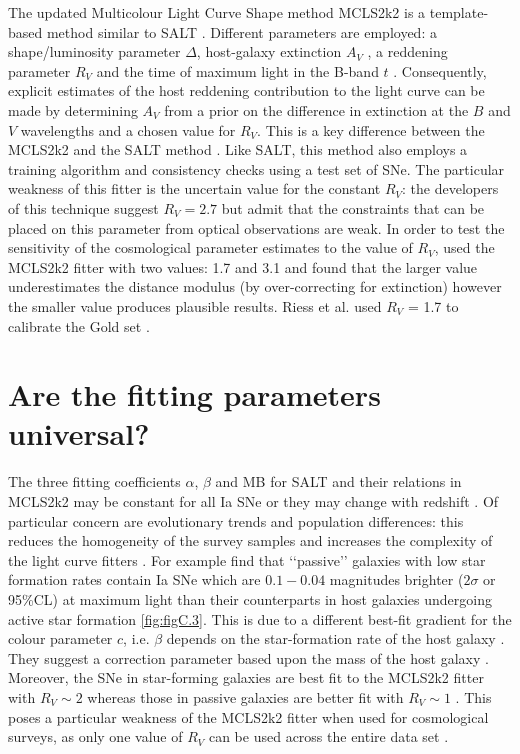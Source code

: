 The updated Multicolour Light Curve Shape method MCLS2k2 is a template-based method similar to SALT \cite{Jha2007}. Different parameters are employed: a shape/luminosity parameter $\Delta{}$, host-galaxy extinction $A_V$ , a reddening parameter $R_V$ and the time of maximum light in the B-band $t$ \cite{Jha2007}. 
Consequently, explicit estimates of the host reddening contribution to the light curve can be made by determining $A_V$ from a prior on the difference in extinction at the $B$ and $V$ wavelengths and a chosen value for $R_V$. This is a key difference between the MCLS2k2 and the SALT method \cite{Hicken2009}. 
Like SALT, this method also employs a training algorithm and consistency checks using a test set of SNe. The particular weakness of this fitter is the uncertain value for the constant $R_V$: the developers of this technique suggest $R_V = 2.7$ but admit that the constraints that can be placed on this parameter from optical observations are weak. 
In order to test the sensitivity of the cosmological parameter estimates to the value of $R_V$, \cite{Hicken2009} used the MCLS2k2 fitter with two values: 1.7 and 3.1 and found that the larger value underestimates the distance modulus (by over-correcting for extinction) however the smaller value produces plausible results. Riess et al. used $R_V$ = 1.7 to calibrate the Gold set \cite{Riess2007}.

\section{Are the fitting parameters universal?}
\label{sec:C.4}

The three fitting coefficients $\alpha$, $\beta$ and MB for SALT and their relations in MCLS2k2 may be constant for all Ia SNe or they may change with redshift \cite{Lidman2010b}. 
Of particular concern are evolutionary trends and population differences: this reduces the homogeneity of the survey samples and increases the complexity of the light curve fitters \cite{Lidman2010b}. For example \cite{Lampeitl2010} find that \lq\lq{}passive\rq\rq{} galaxies with low star formation rates contain Ia SNe which are $0.1 - 0.04$ magnitudes brighter ($2\sigma$ or 95\%CL) at maximum light than their counterparts in host galaxies undergoing active star formation \cref{fig:figC.3}. 
This is due to a different best-fit gradient for the colour parameter $c$, i.e. $\beta$ depends on the star-formation rate of the host galaxy \cite{Lidman2010b}. They suggest a correction parameter based upon the mass of the host galaxy \cite{Lampeitl2010}. 
Moreover, the SNe in star-forming galaxies are best fit to the MCLS2k2 fitter with $R_V \sim 2$ whereas those in passive galaxies are better fit with $R_V \sim 1$ \cite{Lampeitl2010}. 
This poses a particular weakness of the MCLS2k2 fitter when used for cosmological surveys, as only one value of $R_V$ can be used across the entire data set \cite{Hicken2009}.

